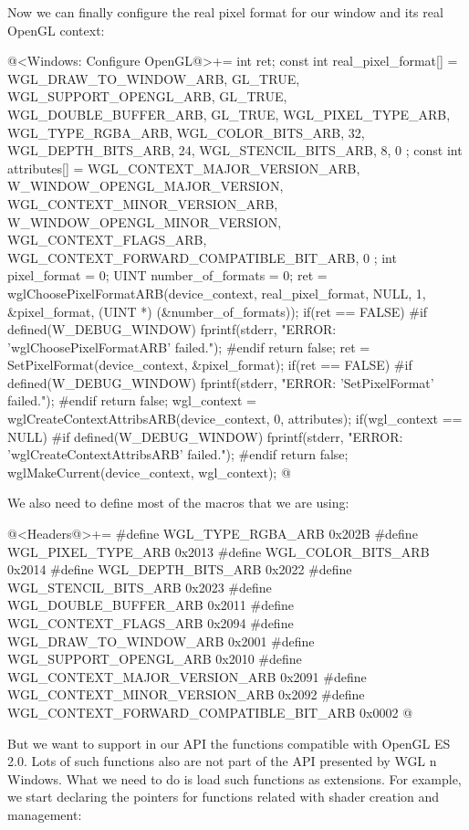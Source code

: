 Now we can finally configure the real pixel format for our window and
its real OpenGL context:

\iniciocodigo
@<Windows: Configure OpenGL@>+=
{
  int ret;
  const int real_pixel_format[] = {
    WGL_DRAW_TO_WINDOW_ARB, GL_TRUE,
    WGL_SUPPORT_OPENGL_ARB, GL_TRUE,
    WGL_DOUBLE_BUFFER_ARB, GL_TRUE,
    WGL_PIXEL_TYPE_ARB, WGL_TYPE_RGBA_ARB,
    WGL_COLOR_BITS_ARB, 32,
    WGL_DEPTH_BITS_ARB, 24,
    WGL_STENCIL_BITS_ARB, 8,
    0 };
  const int attributes[] = {
    WGL_CONTEXT_MAJOR_VERSION_ARB, W_WINDOW_OPENGL_MAJOR_VERSION,
    WGL_CONTEXT_MINOR_VERSION_ARB, W_WINDOW_OPENGL_MINOR_VERSION,
    WGL_CONTEXT_FLAGS_ARB, WGL_CONTEXT_FORWARD_COMPATIBLE_BIT_ARB,
    0 };
  int pixel_format = 0;
  UINT number_of_formats = 0;
  ret = wglChoosePixelFormatARB(device_context, real_pixel_format, NULL, 1,
                                &pixel_format, (UINT *) (&number_of_formats));
  if(ret == FALSE){
#if defined(W_DEBUG_WINDOW)
    fprintf(stderr, "ERROR: 'wglChoosePixelFormatARB' failed.\n");
#endif
    return false;
  }
  ret = SetPixelFormat(device_context, &pixel_format);
  if(ret == FALSE){
#if defined(W_DEBUG_WINDOW)
    fprintf(stderr, "ERROR: 'SetPixelFormat' failed.\n");
#endif
    return false;
  }
  wgl_context = wglCreateContextAttribsARB(device_context, 0, attributes);
  if(wgl_context == NULL){
#if defined(W_DEBUG_WINDOW)
    fprintf(stderr, "ERROR: 'wglCreateContextAttribsARB' failed.\n");
#endif
    return false;
  }
  wglMakeCurrent(device_context, wgl_context);
}
@
\fimcodigo

We also need to define most of the macros that we are using:

\iniciocodigo
@<Headers@>+=
#define WGL_TYPE_RGBA_ARB                      0x202B
#define WGL_PIXEL_TYPE_ARB                     0x2013
#define WGL_COLOR_BITS_ARB                     0x2014
#define WGL_DEPTH_BITS_ARB                     0x2022
#define WGL_STENCIL_BITS_ARB                   0x2023
#define WGL_DOUBLE_BUFFER_ARB                  0x2011
#define WGL_CONTEXT_FLAGS_ARB                  0x2094
#define WGL_DRAW_TO_WINDOW_ARB                 0x2001
#define WGL_SUPPORT_OPENGL_ARB                 0x2010
#define WGL_CONTEXT_MAJOR_VERSION_ARB          0x2091
#define WGL_CONTEXT_MINOR_VERSION_ARB          0x2092
#define WGL_CONTEXT_FORWARD_COMPATIBLE_BIT_ARB 0x0002
@
\fimcodigo

But we want to support in our API the functions compatible with OpenGL
ES 2.0. Lots of such functions also are not part of the API presented
by WGL n Windows. What we need to do is load such functions as
extensions. For example, we start declaring the pointers for functions
related with shader creation and management:

